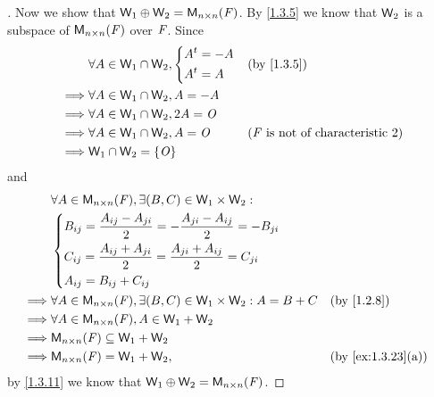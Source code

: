 \begin{proof}[]
  Now we show that \(\W_1 \oplus \W_2 = \ms[n][n][\F]\).
  By \cref{1.3.5} we know that \(\mathsf{W}_2\) is a subspace of \(\ms[n][n][\F]\) over \(\mathit{F}\).
  Since
  \begin{align*}
             & \forall A \in \W_1 \cap \W_2, \begin{dcases}
                                               \tp{A} = -A \\
                                               \tp{A} = A
                                             \end{dcases} &  & \by{1.3.5}                                       \\
    \implies & \forall A \in \W_1 \cap \W_2, A = -A                                                             \\
    \implies & \forall A \in \W_1 \cap \W_2, 2A = \zm                                                           \\
    \implies & \forall A \in \W_1 \cap \W_2, A = \zm        &  & \text{(\(\F\) is not of characteristic \(2\))} \\
    \implies & \W_1 \cap \W_2 = \set{\zm}
  \end{align*}
  and
  \begin{align*}
             & \forall A \in \ms[n][n][\F], \exists (B, C) \in \W_1 \times \W_2 :                                                                                                                                     \\
             & \begin{dcases}
                 B_{i j} = \frac{A_{i j} - A_{j i}}{2} = - \frac{A_{j i} - A_{i j}}{2} = -B_{j i} \\
                 C_{i j} = \frac{A_{i j} + A_{j i}}{2} = \frac{A_{j i} + A_{i j}}{2} = C_{j i}    \\
                 A_{i j} = B_{i j} + C_{i j}
               \end{dcases}                           \\
    \implies & \forall A \in \ms[n][n][\F], \exists (B, C) \in \W_1 \times \W_2 : A = B + C                                                                                                    &  & \by{1.2.8}        \\
    \implies & \forall A \in \ms[n][n][\F], A \in \W_1 + \W_2                                                                                                                                                         \\
    \implies & \ms[n][n][\F] \subseteq \W_1 + \W_2                                                                                                                                                                    \\
    \implies & \ms[n][n][\F] = \W_1 + \W_2,                                                                                                                                                    &  & \by{ex:1.3.23}[a]
  \end{align*}
  by \cref{1.3.11} we know that \(\W_1 \oplus \W_2 = \ms[n][n][\F]\).
\end{proof}

